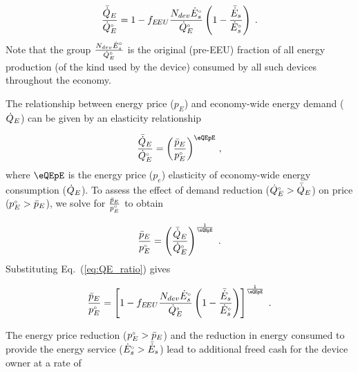 \begin{equation} \label{eq:QE_ratio}
  \frac{\bar{\dot{Q}}_E}{{}{\dot{Q}}^{\scriptscriptstyle \circ}_E} =
        1 - f_{E\!EU} \frac{N_{dev} {}{\dot{E}}^{\scriptscriptstyle \circ}_s}{{}{\dot{Q}}^{\scriptscriptstyle \circ}_E} \left( 1 - \frac{\bar{\dot{E}}_s}{{}{\dot{E}}^{\scriptscriptstyle \circ}_s}  \right) \; .
\end{equation}
%
Note that the group $\frac{N_{dev} {}{\dot{E}}^{\scriptscriptstyle \circ}_s}{{}{\dot{Q}}^{\scriptscriptstyle \circ}_E}$
is the original (pre-EEU) fraction of all energy production
(of the kind used by the device)
consumed by all such devices throughout the economy.

The relationship between energy price ($p_E$) and
economy-wide energy demand ($\dot{Q}_E$)
can be given by an elasticity relationship

\begin{equation}
  \frac{\rainc{Q}_E}{\rorig{Q}_E} = 
          \left( \frac{\ainc{p}_E}{\orig{p}_E} \right)^{\eQEpE} \, ,
\end{equation}
%
where $\eQEpE$ is the energy price ($p_e$) elasticity
of economy-wide energy consumption ($\dot{Q}_E$).
To assess the effect of demand reduction
(${}{\dot{Q}}^{\scriptscriptstyle \circ}_E > \bar{\dot{Q}}_E$)
on price
(${}{p}^{\scriptscriptstyle \circ}_E > \bar{p}_E$),
we solve for $\frac{\bar{p}_E}{{}{p}^{\scriptscriptstyle \circ}_E}$
to obtain

\begin{equation}
  \frac{\ainc{p}_E}{\orig{p}_E} =
        \left( \frac{\rainc{Q}_E}{\rorig{Q}_E} \right)^{\frac{1}{\eQEpE}} \; .
\end{equation}
%
Substituting Eq.~(\ref{eq:QE_ratio}) gives

\begin{equation} \label{eq:price_effect_price_ratio}
  \frac{\ainc{p}_E}{\orig{p}_E} =
        \left[ 1 - f_{\EEU} \frac{N_{dev} \rbempl{E}_s}{\rbempl{Q}_E} \left( 1 - \frac{\rainc{E}_s}{\rbempl{E}_s}  \right) \right]^{\frac{1}{\eQEpE}} \; .
\end{equation}

The energy price reduction (${}{p}^{\scriptscriptstyle \circ}_E > \bar{p}_E$)
and the reduction in energy consumed to provide the 
energy service (${}{\dot{E}}^{\scriptscriptstyle \circ}_s > \bar{\dot{E}}_s$)
lead to additional freed cash for the device owner at a rate of

